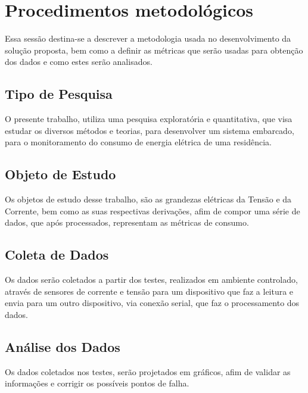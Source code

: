 \section{Procedimentos metodológicos}
Essa sessão destina-se a descrever a metodologia usada no desenvolvimento da solução proposta, bem como a definir as métricas que serão usadas para obtenção dos dados e como estes serão analisados.

\subsection{Tipo de Pesquisa}
O presente trabalho, utiliza uma pesquisa exploratória e quantitativa, que visa estudar os diversos métodos e teorias, para desenvolver um sistema embarcado, para o monitoramento do consumo de energia elétrica de uma residência.

\subsection{Objeto de Estudo}
Os objetos de estudo desse trabalho, são as grandezas elétricas da Tensão e da Corrente, bem como as suas respectivas derivações, afim de compor uma série de dados, que após processados, representam as métricas de consumo.

\subsection{Coleta de Dados}
Os dados serão coletados a partir dos testes, realizados em ambiente controlado, através de sensores de corrente e tensão para um dispositivo que faz a leitura e envia para um outro dispositivo, via conexão serial, que faz o processamento dos dados.

\subsection{Análise dos Dados}
Os dados coletados nos testes, serão projetados em gráficos, afim de validar as informações e corrigir os possíveis pontos de falha.